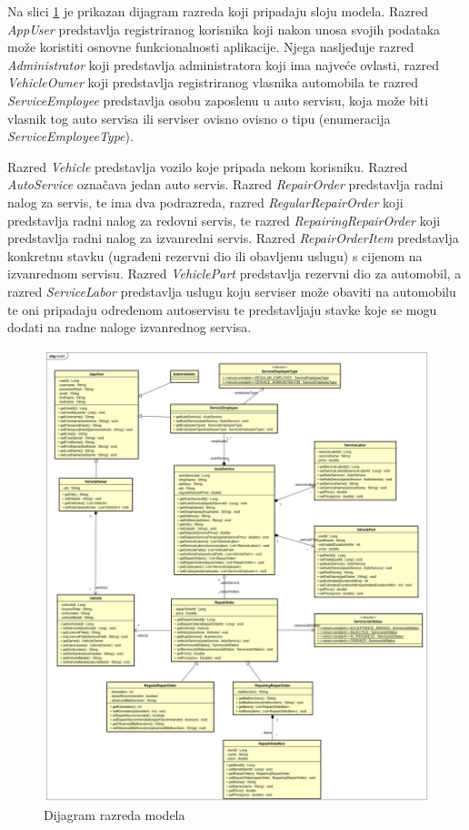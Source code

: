 		Na slici \ref{fig:classdiagram} je prikazan dijagram razreda koji pripadaju sloju modela. Razred \textit{AppUser} predstavlja registriranog korisnika koji nakon unosa svojih podataka može koristiti osnovne funkcionalnosti aplikacije. Njega nasljeđuje razred \textit{Administrator} koji predstavlja administratora koji ima najveće ovlasti, razred \textit{VehicleOwner} koji predstavlja registriranog vlasnika automobila te razred \textit{ServiceEmployee} predstavlja osobu zaposlenu u auto servisu, koja može biti vlasnik tog auto servisa ili serviser ovisno ovisno o tipu (enumeracija \textit{ServiceEmployeeType}).
		
		Razred \textit{Vehicle} predstavlja vozilo koje pripada nekom korisniku. Razred \textit{AutoService} označava jedan auto servis. Razred \textit{RepairOrder} predstavlja radni nalog za servis, te ima dva podrazreda, razred \textit{RegularRepairOrder} koji predstavlja radni nalog za redovni servis, te razred \textit{RepairingRepairOrder} koji predstavlja radni nalog za izvanredni servis. Razred \textit{RepairOrderItem} predstavlja konkretnu stavku (ugrađeni rezervni dio ili obavljenu uslugu) s cijenom na izvanrednom servisu. Razred \textit{VehiclePart} predstavlja rezervni dio za automobil, a razred \textit{ServiceLabor} predstavlja uslugu koju serviser može obaviti na automobilu te oni pripadaju određenom autoservisu te predstavljaju stavke koje se mogu dodati na radne naloge izvanrednog servisa.
		
		\begin{figure}[H]
			\centering
			\includegraphics[width=1.0\linewidth]{dijagrami/class_diagram}
			\caption{Dijagram razreda modela}
			\label{fig:classdiagram}
		\end{figure}
	

